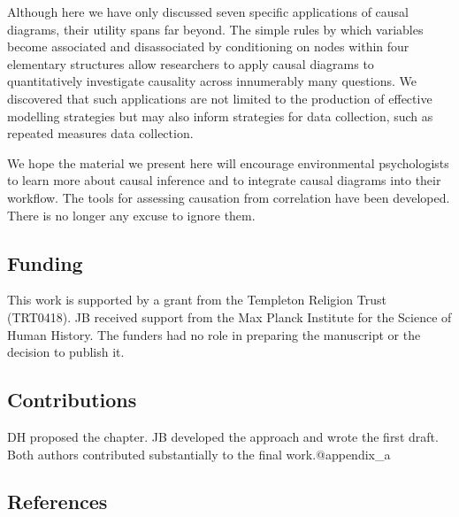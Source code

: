 \documentclass[
  singlecolumn]{article}
\begin{document}
Although here we have only discussed seven specific applications of
causal diagrams, their utility spans far beyond. The simple rules by
which variables become associated and disassociated by conditioning on
nodes within four elementary structures allow researchers to apply
causal diagrams to quantitatively investigate causality across
innumerably many questions. We discovered that such applications are not
limited to the production of effective modelling strategies but may also
inform strategies for data collection, such as repeated measures data
collection.

We hope the material we present here will encourage environmental
psychologists to learn more about causal inference and to integrate
causal diagrams into their workflow. The tools for assessing causation
from correlation have been developed. There is no longer any excuse to
ignore them.

\newpage{}

\subsection{Funding}\label{funding}

This work is supported by a grant from the Templeton Religion Trust
(TRT0418). JB received support from the Max Planck Institute for the
Science of Human History. The funders had no role in preparing the
manuscript or the decision to publish it.

\subsection{Contributions}\label{contributions}

DH proposed the chapter. JB developed the approach and wrote the first
draft. Both authors contributed substantially to the final
work.@appendix\_a

\subsection{References}\label{references}
\end{document}
